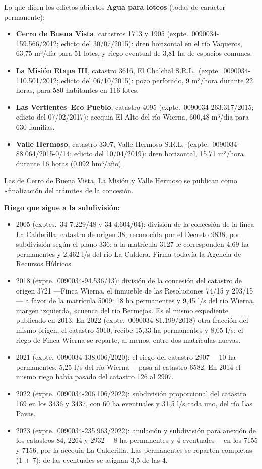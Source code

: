 \begin{ficha}{Lo que dicen los edictos abiertos}
\textbf{Agua para loteos} (todas de carácter permanente):
\begin{itemize}[leftmargin=*,nosep]
\item \textbf{Cerro de Buena Vista}, catastros 1713 y 1905 (expte.\ 0090034-159.566/2012; edicto del 30/07/2015): dren horizontal en el río Vaqueros, 63,75 m³/día para 51 lotes, y riego eventual de 3,81 ha de espacios comunes.
\item \textbf{La Misión Etapa III}, catastro 3616, El Chalchal S.R.L.\ (expte.\ 0090034-110.501/2012; edicto del 06/10/2015): pozo perforado, 9 m³/hora durante 22 horas, para 580 habitantes en 116 lotes.
\item \textbf{Las Vertientes--Eco Pueblo}, catastro 4095 (expte.\ 0090034-263.317/2015; edicto del 07/02/2017): acequia El Alto del río Wierna, 600,48 m³/día para 630 familias.
\item \textbf{Valle Hermoso}, catastro 3307, Valle Hermoso S.R.L.\ (expte.\ 0090034-88.064/2015-0/14; edicto del 10/04/2019): dren horizontal, 15,71 m³/hora durante 16 horas (0,092 hm³/año).
\end{itemize}
Las de Cerro de Buena Vista, La Misión y Valle Hermoso se publican como «finalización del trámite» de la concesión.

\textbf{Riego que sigue a la subdivisión:}
\begin{itemize}[leftmargin=*,nosep]
\item 2005 (exptes.\ 34-7.229/48 y 34-4.604/04): división de la concesión de la finca La Calderilla, catastro de origen 38, reconocida por el Decreto 9838, por subdivisión según el plano 336; a la matrícula 3127 le corresponden 4,69 ha permanentes y 2,462 l/s del río La Caldera. Firma todavía la Agencia de Recursos Hídricos.
\item 2018 (expte.\ 0090034-94.536/13): división de la concesión del catastro de origen 3721 ---Finca Wierna, el inmueble de las Resoluciones 74/15 y 293/15--- a favor de la matrícula 5009: 18 ha permanentes y 9,45 l/s del río Wierna, margen izquierda, «cuenca del río Bermejo». Es el mismo expediente publicado en 2013. En 2022 (expte.\ 0090034-81.199/2018) otra fracción del mismo origen, el catastro 5010, recibe 15,33 ha permanentes y 8,05 l/s: el riego de Finca Wierna se reparte, al menos, entre dos matrículas nuevas.
\item 2021 (expte.\ 0090034-138.006/2020): el riego del catastro 2907 ---10 ha permanentes, 5,25 l/s del río Wierna--- pasa al catastro 6582. En 2014 el mismo riego había pasado del catastro 126 al 2907.
\item 2022 (expte.\ 0090034-206.106/2022): subdivisión proporcional del catastro 169 en los 3436 y 3437, con 60 ha eventuales y 31,5 l/s cada uno, del río Las Pavas.
\item 2023 (expte.\ 0090034-235.963/2022): anulación y subdivisión para anexión de los catastros 84, 2264 y 2932 ---8 ha permanentes y 4 eventuales--- en los 7155 y 7156, por la acequia La Calderilla. Las permanentes se reparten completas (1 + 7); de las eventuales se asignan 3,5 de las 4.
\end{itemize}


\end{ficha}
